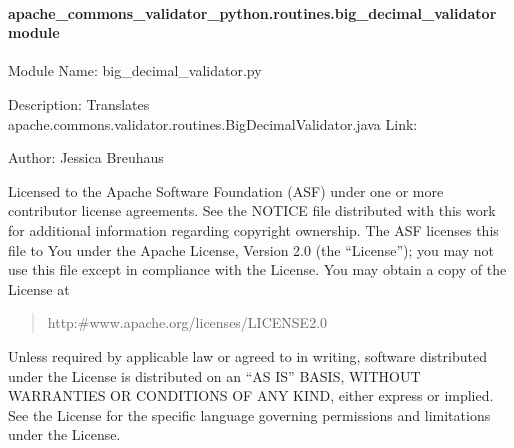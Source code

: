 \documentclass[letterpaper,10pt,english]{sphinxmanual}
\begin{document}
\paragraph{apache\_commons\_validator\_python.routines.big\_decimal\_validator module}
\label{\detokenize{apache_commons_validator_python.routines:module-apache_commons_validator_python.routines.big_decimal_validator}}\label{\detokenize{apache_commons_validator_python.routines:apache-commons-validator-python-routines-big-decimal-validator-module}}
\sphinxAtStartPar
Module Name: big\_decimal\_validator.py

\sphinxAtStartPar
Description: Translates apache.commons.validator.routines.BigDecimalValidator.java
Link: 

\sphinxAtStartPar
Author: Jessica Breuhaus
\begin{description}
\sphinxAtStartPar
Licensed to the Apache Software Foundation (ASF) under one or more
contributor license agreements.  See the NOTICE file distributed with
this work for additional information regarding copyright ownership.
The ASF licenses this file to You under the Apache License, Version 2.0
(the “License”); you may not use this file except in compliance with
the License.  You may obtain a copy of the License at
\begin{quote}

\sphinxAtStartPar
http:\#www.apache.org/licenses/LICENSE\sphinxhyphen{}2.0
\end{quote}

\sphinxAtStartPar
Unless required by applicable law or agreed to in writing, software
distributed under the License is distributed on an “AS IS” BASIS,
WITHOUT WARRANTIES OR CONDITIONS OF ANY KIND, either express or implied.
See the License for the specific language governing permissions and
limitations under the License.

\end{description}
\end{document}
